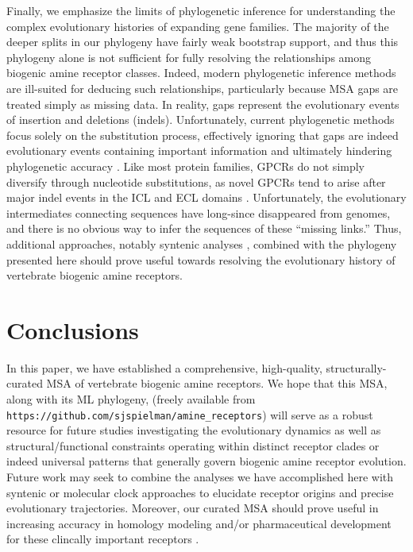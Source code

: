 \documentclass[fleqn,10pt]{wlpeerj}
\begin{document}
Finally, we emphasize the limits of phylogenetic inference for understanding the complex evolutionary histories of expanding gene families. The majority of the deeper splits in our phylogeny have fairly weak bootstrap support, and thus this phylogeny alone is not sufficient for fully resolving the relationships among biogenic amine receptor classes. Indeed, modern phylogenetic inference methods are ill-suited for deducing such relationships, particularly because MSA gaps are treated simply as missing data. In reality, gaps represent the evolutionary events of insertion and deletions (indels). Unfortunately, current phylogenetic methods focus solely on the substitution process, effectively ignoring that gaps are indeed evolutionary events containing important information and ultimately hindering phylogenetic accuracy \cite{Morrison2008,Loytynoja2008,Warnow2012,Luanetal2013}. Like most protein families, GPCRs do not simply diversify through nucleotide substitutions, as novel GPCRs tend to arise after major indel events in the ICL and ECL domains \citep{BockaertPin1999}. Unfortunately, the evolutionary intermediates connecting sequences have long-since disappeared from genomes, and there is no obvious way to infer the sequences of these ``missing links.'' Thus, additional approaches, notably syntenic analyses \citep{Sundstrom2010,Widmark2011,YegorovGood2012,Hwangetal2013}, combined with the phylogeny presented here should prove useful towards resolving the evolutionary history of vertebrate biogenic amine receptors. 

\section*{Conclusions}

In this paper, we have established a comprehensive, high-quality, structurally-curated MSA of vertebrate biogenic amine receptors. We hope that this MSA, along with its ML phylogeny, (freely available from \texttt{https://github.com/sjspielman/amine\_receptors}) will serve as a robust resource for future studies investigating the evolutionary dynamics as well as structural/functional constraints operating within distinct receptor clades or indeed universal patterns that generally govern biogenic amine receptor evolution. Future work may seek to combine the analyses we have accomplished here with syntenic or molecular clock approaches to elucidate receptor origins and precise evolutionary trajectories. Moreover, our curated MSA should prove useful in increasing accuracy in homology modeling and/or pharmaceutical development for these clincally important receptors \citep{Kristiansen2004,Ishiguro2004,Eversetal2005,Masonetal2012}.
\end{document}
